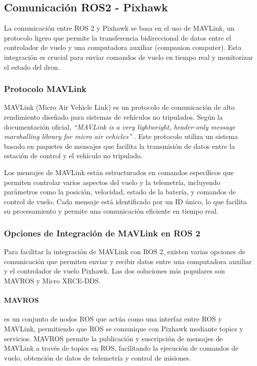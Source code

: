 \subsection{Comunicación ROS2 - Pixhawk}
    La comunicación entre ROS 2 y Pixhawk se basa en el uso de MAVLink, un protocolo ligero que permite la transferencia bidireccional de datos entre el controlador de vuelo y una computadora auxiliar (companion computer). Esta integración es crucial para enviar comandos de vuelo en tiempo real y monitorizar el estado del dron.
    
        \subsubsection{Protocolo MAVLink}
        MAVLink (Micro Air Vehicle Link) es un protocolo de comunicación de alto rendimiento diseñado para sistemas de vehículos no tripulados. Según la documentación oficial, \textit{“MAVLink is a very lightweight, header-only message marshalling library for micro air vehicles”} \cite{mavlink_docs}. Este protocolo utiliza un sistema basado en paquetes de mensajes que facilita la transmisión de datos entre la estación de control y el vehículo no tripulado.
    
        Los mensajes de MAVLink están estructurados en comandos específicos que permiten controlar varios aspectos del vuelo y la telemetría, incluyendo parámetros como la posición, velocidad, estado de la batería, y comandos de control de vuelo. Cada mensaje está identificado por un ID único, lo que facilita su procesamiento y permite una comunicación eficiente en tiempo real.
    
        \subsubsection{Opciones de Integración de MAVLink en ROS 2}
        Para facilitar la integración de MAVLink con ROS 2, existen varias opciones de comunicación que permiten enviar y recibir datos entre una computadora auxiliar y el controlador de vuelo Pixhawk. Las dos soluciones más populares son MAVROS y Micro XRCE-DDS.
    
            \paragraph{MAVROS}
            es un conjunto de nodos ROS que actúa como una interfaz entre ROS y MAVLink, permitiendo que ROS se comunique con Pixhawk mediante topics y servicios. MAVROS permite la publicación y suscripción de mensajes de MAVLink a través de topics en ROS, facilitando la ejecución de comandos de vuelo, obtención de datos de telemetría y control de misiones.
    
